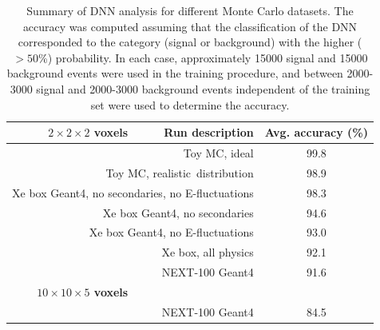 \documentclass[a4paper,11pt]{article}
\begin{document}
\begin{table}[!t]
	\begin{center}
		\caption[DNN analysis summary]{\label{tbl.DNNsummary}Summary of DNN analysis for different Monte Carlo datasets.  The accuracy was computed assuming that the classification
			of the DNN corresponded to the category (signal or background) with the higher ($> 50$\%) probability.  In each case, approximately 15000 signal and 15000 background events were
			used in the training procedure, and between 2000-3000 signal and 2000-3000 background events independent of the training set were used to determine the accuracy.}
		\begin{tabular}{rrc}
			\\
			\textbf{$2 \times 2 \times 2$ voxels} & \textbf{Run description} & \textbf{Avg. accuracy} (\%)\\
			\hline
			\multicolumn{2}{r}{Toy MC, ideal} & 99.8\\
			\multicolumn{2}{r}{Toy MC, realistic \bbonu\,distribution} & 98.9\\
			\multicolumn{2}{r}{Xe box Geant4, no secondaries, no E-fluctuations} & 98.3\\
			\multicolumn{2}{r}{Xe box Geant4, no secondaries} & 94.6\\
			\multicolumn{2}{r}{Xe box Geant4, no E-fluctuations} & 93.0\\
			\multicolumn{2}{r}{Xe box, all physics} & 92.1\\
			\multicolumn{2}{r}{NEXT-100 Geant4} & 91.6\\
			\textbf{$10 \times 10 \times 5$ voxels} & & \\
			\hline
			\multicolumn{2}{r}{NEXT-100 Geant4} & 84.5
		\end{tabular}
	\end{center}
\end{table}
\end{document}
